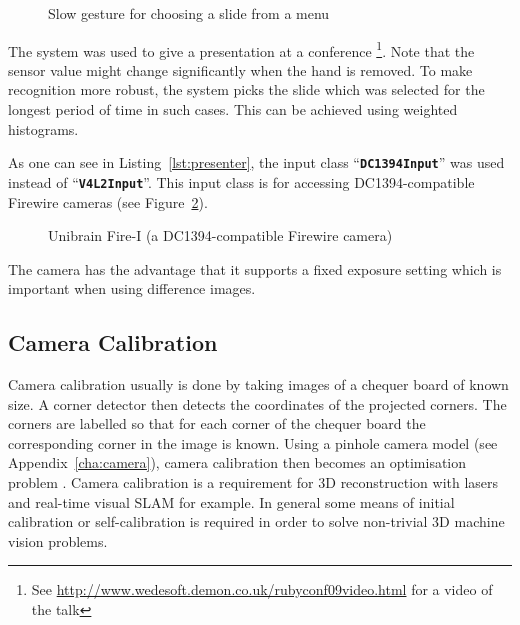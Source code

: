 \documentclass[12pt,a4paper,oneside,openright]{book}
\newcommand{\anx}[1]{Appendix~\ref{cha:#1}}
\newcommand{\fig}[1]{Figure~\ref{fig:#1}}
\newcommand{\lst}[1]{Listing~\ref{lst:#1}}
\newcommand{\code}[1]{``\texttt{\textbf{\textcolor{codegray}{\small{#1}}}}''}
\begin{document}
\begin{CJK}{UTF8}{}
\begin{figure}[htbp]
\begin{center}
    \caption{Slow gesture for choosing a slide from a menu\label{fig:presentmenu}}
  \end{center}
\end{figure}
The system was used to give a presentation at a conference \citep{w2009}\footnote{See \url{http://www.wedesoft.demon.co.uk/rubyconf09video.html} for a video of the talk}. Note that the sensor value might change significantly when the hand is removed. To make recognition more robust, the system picks the slide which was selected for the longest period of time in such cases. This can be achieved using weighted histograms.

As one can see in \lst{presenter}, the input class \code{DC1394Input} was used instead of \code{V4L2Input}. This input class is for accessing DC1394-compatible Firewire cameras (see \fig{unibrain}).
\begin{figure}[htbp]
  \begin{center}
    \caption{Unibrain Fire-I (a DC1394-compatible Firewire camera)\label{fig:unibrain}}
  \end{center}
\end{figure}
The camera has the advantage that it supports a fixed exposure setting which is important when using difference images.

\subsection{Camera Calibration}\label{cha:gridcalib}
Camera calibration usually is done by taking images of a chequer board of known size. A corner detector then detects the coordinates of the projected corners. The corners are labelled so that for each corner of the chequer board the corresponding corner in the image is known. Using a pinhole camera model (see \anx{camera}), camera calibration then becomes an optimisation problem \citep{RefWorks:529,zhang2000flexible,faucher}. Camera calibration is a requirement for \ac{3D} reconstruction with lasers \citep{lim} and real-time visual \ac{SLAM} \citep{RefWorks:468,RefWorks:513} for example. In general some means of initial calibration or self-calibration \citep{mendonca1999simple} is required in order to solve non-trivial \ac{3D} machine vision problems.


\end{CJK}
\end{document}
